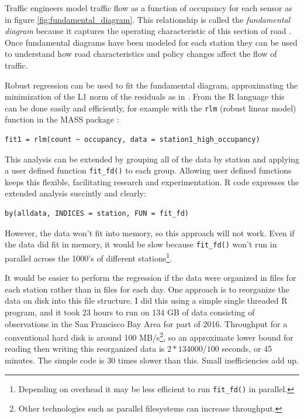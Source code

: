 \documentclass[12pt]{article}
\begin{document}
Traffic engineers model traffic flow as a function of occupancy for each
sensor as in figure \ref{fig:fundamental_diagram}. This relationship is
called the \emph{fundamental diagram} because it captures the operating
characteristic of this section of road \cite{daganzo1997fundamentals}. Once
fundamental diagrams have been modeled for each station they can be used to
understand how road characteristics and policy changes affect the flow of
traffic.

Robust regression can be used to fit the fundamental diagram, approximating
the minimization of the L1 norm of the residuals as in
\cite{li2011fundamental}.  From the R language this can be done easily and
efficiently, for example with the \texttt{rlm} (robust linear model)
function in the MASS package \cite{venables2013modern}:

\begin{verbatim}
fit1 = rlm(count ~ occupancy, data = station1_high_occupancy)
\end{verbatim}

This analysis can be extended by grouping all of the data by station and
applying a user defined function \texttt{fit\_fd()} to each group.
Allowing user defined functions keeps this flexible, facilitating research
and experimentation. R code expresses the extended analysis succintly and
clearly:

\begin{verbatim}
by(alldata, INDICES = station, FUN = fit_fd)
\end{verbatim}

However, the data won't fit into memory, so this approach will not work.
Even if the data did fit in memory, it would be slow because \texttt{fit\_fd()} won't
run in parallel across the 1000's of different stations\footnote{
Depending on overhead it may be less efficient to run \texttt{fit\_fd()} in
parallel.}.

It would be easier to perform the regression if the data were
organized in files for each station rather than in files for each day.  One
approach is to reorganize the data on disk into this file structure. I
did this using a simple single threaded R program, and it took 23 hours to
run on 134 GB of data consisting of observations in the San Francisco Bay
Area for part of 2016.  Throughput for a conventional hard disk is around
100 MB/s\footnote{Other technologies such as parallel filesystems can
increase throughput.}, so an approximate lower bound for reading then
writing this reorganized data is $2 * 134000 / 100$ seconds, or 45 minutes.
The simple code is 30 times slower than this. Small inefficiencies add up.
\end{document}
